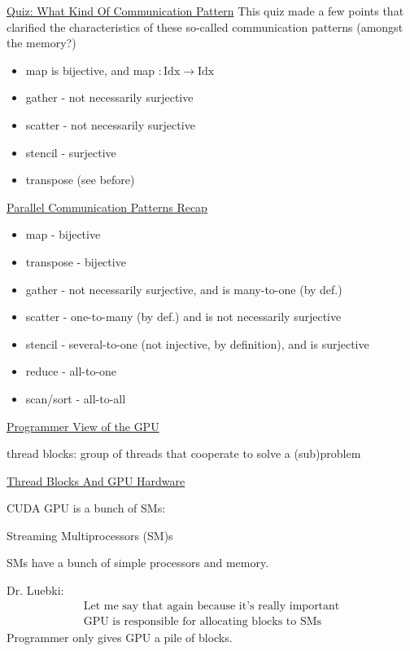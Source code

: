 \documentclass[10pt]{amsart}
\begin{document}
\begin{multicols*}{2}
\href{https://classroom.udacity.com/courses/cs344/lessons/77202674/concepts/787012800923}{Quiz: What Kind Of Communication Pattern}
This quiz made a few points that clarified the characteristics of these so-called communication patterns (amongst the memory?)

\begin{itemize}
  \item map is bijective, and map $:\text{Idx} \to \text{Idx}$
  \item gather - not necessarily surjective
  \item scatter - not necessarily surjective 
  \item stencil - surjective
  \item transpose (see before)
  \end{itemize}




\href{https://classroom.udacity.com/courses/cs344/lessons/77202674/concepts/773153720923}{Parallel Communication Patterns Recap}

\begin{itemize}
\item map - bijective
\item transpose - bijective
\item gather - not necessarily surjective, and is many-to-one (by def.)
\item scatter - one-to-many (by def.) and is not necessarily surjective
\item stencil - several-to-one (not injective, by definition), and is surjective
\item reduce - all-to-one
  \item scan/sort - all-to-all
\end{itemize}

\href{https://classroom.udacity.com/courses/cs344/lessons/77202674/concepts/773153760923}{Programmer View of the GPU}

thread blocks: group of threads that cooperate to solve a (sub)problem

\href{https://classroom.udacity.com/courses/cs344/lessons/77202674/concepts/773153770923}{Thread Blocks And GPU Hardware}

CUDA GPU is a bunch of SMs:

Streaming Multiprocessors (SM)s

SMs have a bunch of simple processors and memory.

Dr. Luebki:
\[
\boxed{ \begin{gathered}
    \text{Let me say that again because it's really important} \\
    \text{GPU is responsible for allocating blocks to SMs}
  \end{gathered}
  }
\]
Programmer only gives GPU a pile of blocks.


\end{multicols*}
\end{document}
